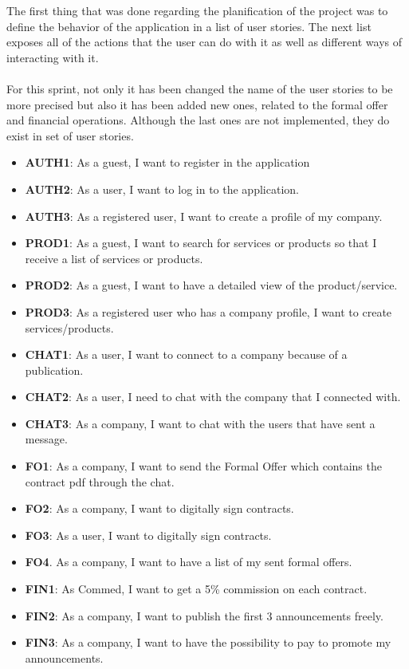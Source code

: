 \documentclass[./main.tex]{subfiles}
\begin{document}
The first thing that was done regarding the planification of the project
was to define the behavior of the application in a list of user stories.
The next list exposes all of the actions that the user can do with it as
well as different ways of interacting with it.
\\
\\
For this sprint, not only it has been changed the name of the user stories to be more precised but also it has been added new ones, related to the formal offer and financial operations. Although the last ones are not implemented, they do exist in set of user stories.
\begin{itemize}
	\item \textbf{AUTH1}: As a guest, I want to register in the application 
	\item \textbf{AUTH2}: As a user, I want to log in to the application. 
	\item \textbf{AUTH3}: As a registered user, I want to create a profile of my company.
	\item \textbf{PROD1}: As a guest, I want to search for services or products so that I receive a list of services or products.
	\item \textbf{PROD2}: As a guest, I want to have a detailed view of the product/service.
	\item \textbf{PROD3}: As a registered user who has a company profile, I want to create services/products.
	\item \textbf{CHAT1}: As a user, I want to connect to a company because of a publication.
	\item \textbf{CHAT2}: As a user, I need to chat with the company that I connected with.
	\item \textbf{CHAT3}: As a company, I want to chat with the users that have sent a message.
	\item \textbf{FO1}: As a company, I want to send the Formal Offer which contains the contract pdf through the chat.
	\item \textbf{FO2}: As a company, I want to digitally sign contracts.
	\item \textbf{FO3}: As a user, I want to digitally sign contracts.
	\item \textbf{FO4}. As a company, I want to have a list of my sent formal offers.
	\item \textbf{FIN1}: As Commed, I want to get a 5\% commission on each contract.
	\item \textbf{FIN2}: As a company, I want to publish the first 3 announcements freely.
	\item \textbf{FIN3}: As a company, I want to have the possibility to pay to promote my announcements.
\end{itemize}
\end{document}
